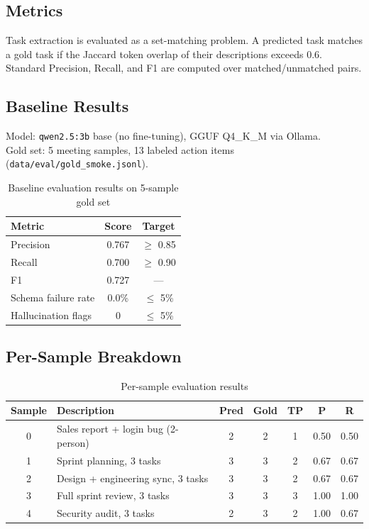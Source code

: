 \documentclass[12pt,a4paper]{article}
\begin{document}
\subsection{Metrics}

Task extraction is evaluated as a set-matching problem. A predicted task matches a gold task if the Jaccard token overlap of their descriptions exceeds 0.6. Standard Precision, Recall, and F1 are computed over matched/unmatched pairs.

\subsection{Baseline Results}

Model: \texttt{qwen2.5:3b} base (no fine-tuning), GGUF Q4\_K\_M via Ollama. \\
Gold set: 5 meeting samples, 13 labeled action items (\texttt{data/eval/gold\_smoke.jsonl}).

\begin{table}[H]
\centering
\begin{tabular}{lcc}
\toprule
\textbf{Metric} & \textbf{Score} & \textbf{Target} \\
\midrule
Precision & 0.767 & $\geq$ 0.85 \\
Recall    & 0.700 & $\geq$ 0.90 \\
F1        & 0.727 & — \\
Schema failure rate & 0.0\% & $\leq$ 5\% \\
Hallucination flags & 0     & $\leq$ 5\% \\
\bottomrule
\end{tabular}
\caption{Baseline evaluation results on 5-sample gold set}
\end{table}

\subsection{Per-Sample Breakdown}

\begin{table}[H]
\centering
\begin{tabular}{clccccc}
\toprule
\textbf{Sample} & \textbf{Description} & \textbf{Pred} & \textbf{Gold} & \textbf{TP} & \textbf{P} & \textbf{R} \\
\midrule
0 & Sales report + login bug (2-person) & 2 & 2 & 1 & 0.50 & 0.50 \\
1 & Sprint planning, 3 tasks & 3 & 3 & 2 & 0.67 & 0.67 \\
2 & Design + engineering sync, 3 tasks & 3 & 3 & 2 & 0.67 & 0.67 \\
3 & Full sprint review, 3 tasks & 3 & 3 & 3 & 1.00 & 1.00 \\
4 & Security audit, 3 tasks & 2 & 3 & 2 & 1.00 & 0.67 \\
\bottomrule
\end{tabular}
\caption{Per-sample evaluation results}
\end{table}
\end{document}
